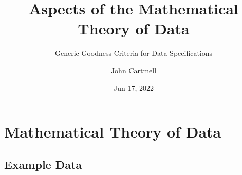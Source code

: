 

\usepackage{mathptmx}
\usepackage{amsfonts}
\usepackage{wasysym}
\usepackage{url}
\usepackage{hyperref}


\newcommand{\sharedmacros}{../../SharedMacros}










\renewcommand{\erpictureFolder}[0]{../../SharedPictures}
\setcounter{equation}{0}



\title[John Cartmell]{Aspects of the Mathematical Theory of Data}
\subtitle{Generic Goodness Criteria for Data Specifications}
\author{John Cartmell}
\date{Jun 17, 2022}

\usepackage{framed}
\usepackage{bibentry}
\usepackage{colortbl}
\usepackage{ulem}   %
\usepackage{listings}
\usepackage{arydshln} %
\usepackage{pst-arrow} %

\nobibliography*



\begin{frame}
\titlepage
\end{frame}


\section{Mathematical Theory of Data}
\iffalse
\subsection{Introduction}

\fi

\subsection{Example Data}


